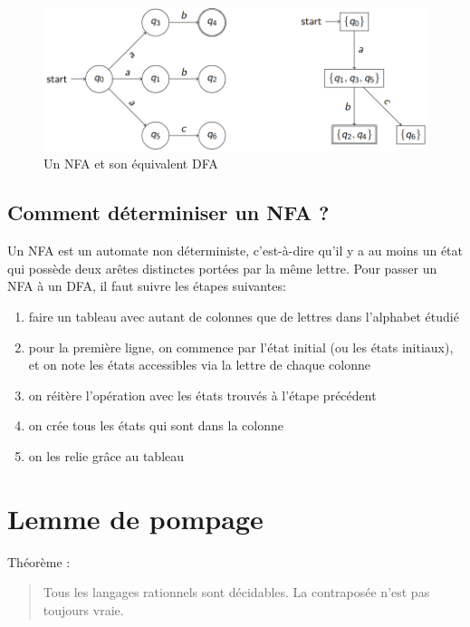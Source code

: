 \documentclass{article}
\begin{document}
\begin{figure}[h]
    \centering
    \includegraphics[scale=0.3]{nfa_dfa.png}
    \caption{Un NFA et son équivalent DFA}
\end{figure}
\subsection{Comment déterminiser un NFA ?}
Un NFA est un automate non déterministe, c'est-à-dire qu'il y a au moins un état qui possède deux arêtes distinctes portées par la même lettre.
Pour passer un NFA à un DFA, il faut suivre les étapes suivantes:
\begin{enumerate}
	\item faire un tableau avec autant de colonnes que de lettres dans l'alphabet étudié
	\item pour la première ligne, on commence par l'état initial (ou les états initiaux), et on note les états accessibles via la lettre de chaque colonne
	\item on réitère l'opération avec les états trouvés à l'étape précédent
	\item on crée tous les états qui sont dans la colonne
	\item on les relie grâce au tableau
\end{enumerate}
\newpage



















\section{Lemme de pompage}
Théorème :
\begin{quote}
    Tous les langages rationnels sont décidables. La contraposée n'est pas toujours vraie.
\end{quote}
\end{document}

